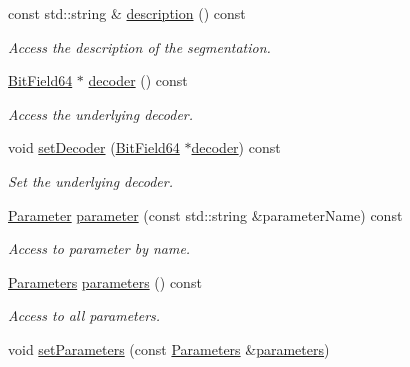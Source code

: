 \begin{DoxyCompactItemize}
const std\+::string \& \hyperlink{class_d_d4hep_1_1_geometry_1_1_segmentation_object_a930896247114bce26d42b6966e2f8ac5}{description} () const
\begin{DoxyCompactList}\small\item\em Access the description of the segmentation. \end{DoxyCompactList}\item 
\hyperlink{class_d_d4hep_1_1_d_d_segmentation_1_1_bit_field64}{Bit\+Field64} $\ast$ \hyperlink{class_d_d4hep_1_1_geometry_1_1_segmentation_object_abc372258e19cc674c4836de96cc894e1}{decoder} () const
\begin{DoxyCompactList}\small\item\em Access the underlying decoder. \end{DoxyCompactList}\item 
void \hyperlink{class_d_d4hep_1_1_geometry_1_1_segmentation_object_a318c9d8bca82285c36af55528d401fd7}{set\+Decoder} (\hyperlink{class_d_d4hep_1_1_d_d_segmentation_1_1_bit_field64}{Bit\+Field64} $\ast$\hyperlink{class_d_d4hep_1_1_geometry_1_1_segmentation_object_abc372258e19cc674c4836de96cc894e1}{decoder}) const
\begin{DoxyCompactList}\small\item\em Set the underlying decoder. \end{DoxyCompactList}\item 
\hyperlink{class_d_d4hep_1_1_geometry_1_1_segmentation_object_a0d017ffe7385b6fe44bf411386cc672b}{Parameter} \hyperlink{class_d_d4hep_1_1_geometry_1_1_segmentation_object_a707f9342c07bf61a61c73c19b24b981a}{parameter} (const std\+::string \&parameter\+Name) const
\begin{DoxyCompactList}\small\item\em Access to parameter by name. \end{DoxyCompactList}\item 
\hyperlink{class_d_d4hep_1_1_geometry_1_1_segmentation_object_adb4bb039e0cd15ea9fbe0232d07c49cc}{Parameters} \hyperlink{class_d_d4hep_1_1_geometry_1_1_segmentation_object_a5cfd3ee9527c7beeb571b1364990ada1}{parameters} () const
\begin{DoxyCompactList}\small\item\em Access to all parameters. \end{DoxyCompactList}\item 
void \hyperlink{class_d_d4hep_1_1_geometry_1_1_segmentation_object_a8246875bc5c3dd4c4613bf56350690da}{set\+Parameters} (const \hyperlink{class_d_d4hep_1_1_geometry_1_1_segmentation_object_adb4bb039e0cd15ea9fbe0232d07c49cc}{Parameters} \&\hyperlink{class_d_d4hep_1_1_geometry_1_1_segmentation_object_a5cfd3ee9527c7beeb571b1364990ada1}{parameters})

\end{DoxyCompactItemize}

